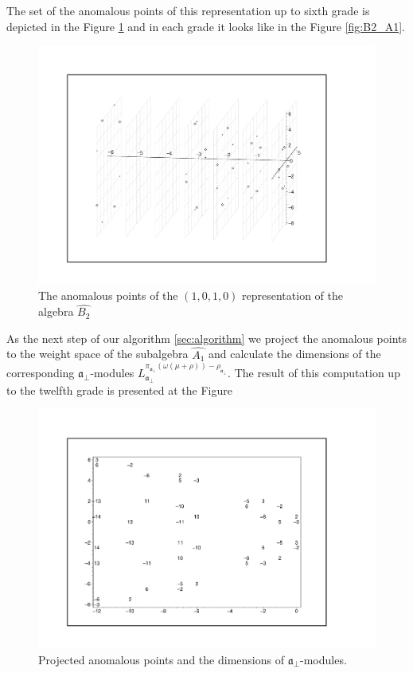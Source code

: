 \documentclass[a4paper,12pt]{article}
\theoremstyle{definition} \newtheorem{Def}{Definition}
\begin{document}
The set of the anomalous points of this representation up to sixth grade is depicted in the Figure \ref{fig:affine_B2_anom_point} and in each grade it looks like in the Figure \ref{fig:B2_A1}. 

\begin{figure}[h!tb]
  \includegraphics[width=160mm]{AffineB2_A1_Anom.pdf}
  \caption{The anomalous points of the $(1,0,1,0)$ representation of the algebra $\hat{B_2}$}
  \label{fig:affine_B2_anom_point}
\end{figure}

As the next step of our algorithm \ref{sec:algorithm} we project the anomalous points to the weight space of the subalgebra $\hat{A_1}$ and calculate the dimensions of the corresponding $\mathfrak{a}_{\bot}$-modules $L^{\pi_{\mathfrak{a}_{\bot}}(\omega(\mu+\rho))-\rho_{\mathfrak{a}_{\bot}}}_{\mathfrak{a}_{\bot}}$.
The result of this computation up to the twelfth grade is presented at the Figure
\begin{figure}[h!tb]
  \centering
  \includegraphics[width=150mm]{AffineB2_A1_proj_anom.pdf}
  \caption{Projected anomalous points and the dimensions of $\mathfrak{a}_{\bot}$-modules.}
  \label{fig:AffineB2_A1_anom_proj}
\end{figure}
\end{document}
